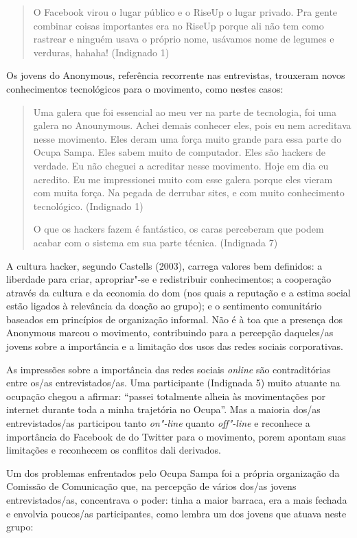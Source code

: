 \begin{quote}
O Facebook virou o lugar público e o RiseUp o lugar privado. Pra gente
combinar coisas importantes era no RiseUp porque ali não tem como
rastrear e ninguém usava o próprio nome, usávamos nome de legumes e
verduras, hahaha! (Indignado 1)
\end{quote}

Os jovens do Anonymous, referência recorrente nas entrevistas, trouxeram
novos conhecimentos tecnológicos para o movimento, como nestes casos:

\begin{quote}
Uma galera que foi essencial ao meu ver na parte de tecnologia, foi uma
galera no Anounymous. Achei demais conhecer eles, pois eu nem acreditava
nesse movimento. Eles deram uma força muito grande para essa parte do
Ocupa Sampa. Eles sabem muito de computador. Eles são hackers de
verdade. Eu não cheguei a acreditar nesse movimento. Hoje em dia eu
acredito. Eu me impressionei muito com esse galera porque eles vieram
com muita força. Na pegada de derrubar sites, e com muito conhecimento
tecnológico. (Indignado 1)

O que os hackers fazem é fantástico, os caras perceberam que podem
acabar com o sistema em sua parte técnica. (Indignada 7)
\end{quote}

A cultura hacker, segundo Castells (2003), carrega valores bem
definidos: a liberdade para criar, apropriar"-se e redistribuir
conhecimentos; a cooperação através da cultura e da economia do dom (nos
quais a reputação e a estima social estão ligados à relevância da doação
ao grupo); e o sentimento comunitário baseados em princípios de
organização informal. Não é à toa que a presença dos Anonymous marcou o
movimento, contribuindo para a percepção daqueles/as jovens sobre a
importância e a limitação dos usos das redes sociais corporativas.

As impressões sobre a importância das redes sociais \emph{online} são
contraditórias entre os/as entrevistados/as. Uma participante (Indignada
5) muito atuante na ocupação chegou a afirmar: ``passei totalmente
alheia às movimentações por internet durante toda a minha trajetória no
Ocupa''. Mas a maioria dos/as entrevistados/as participou tanto
\emph{on"-line} quanto \emph{off"-line} e reconhece a importância do
Facebook de do Twitter para o movimento, porem apontam suas limitações e
reconhecem os conflitos dali derivados.

Um dos problemas enfrentados pelo Ocupa Sampa foi a própria organização
da Comissão de Comunicação que, na percepção de vários dos/as jovens
entrevistados/as, concentrava o poder: tinha a maior barraca, era a mais
fechada e envolvia poucos/as participantes, como lembra um dos jovens
que atuava neste grupo:

